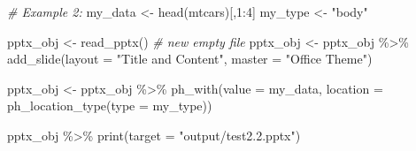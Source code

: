 \documentclass[
]{book}
\newenvironment{Shaded}{\begin{snugshade}}{\end{snugshade}}
\newcommand{\AttributeTok}[1]{\textcolor[rgb]{0.77,0.63,0.00}{#1}}
\newcommand{\CommentTok}[1]{\textcolor[rgb]{0.56,0.35,0.01}{\textit{#1}}}
\newcommand{\DecValTok}[1]{\textcolor[rgb]{0.00,0.00,0.81}{#1}}
\newcommand{\FunctionTok}[1]{\textcolor[rgb]{0.00,0.00,0.00}{#1}}
\newcommand{\NormalTok}[1]{#1}
\newcommand{\OtherTok}[1]{\textcolor[rgb]{0.56,0.35,0.01}{#1}}
\newcommand{\SpecialCharTok}[1]{\textcolor[rgb]{0.00,0.00,0.00}{#1}}
\newcommand{\StringTok}[1]{\textcolor[rgb]{0.31,0.60,0.02}{#1}}
\begin{document}
\begin{Shaded}
\begin{Highlighting}[]
\CommentTok{\# Example 2: }
\NormalTok{my\_data }\OtherTok{\textless{}{-}} \FunctionTok{head}\NormalTok{(mtcars)[,}\DecValTok{1}\SpecialCharTok{:}\DecValTok{4}\NormalTok{]}
\NormalTok{my\_type }\OtherTok{\textless{}{-}} \StringTok{"body"}

\NormalTok{pptx\_obj }\OtherTok{\textless{}{-}} \FunctionTok{read\_pptx}\NormalTok{() }\CommentTok{\# new empty file}
\NormalTok{pptx\_obj }\OtherTok{\textless{}{-}}\NormalTok{ pptx\_obj }\SpecialCharTok{\%\textgreater{}\%} 
    \FunctionTok{add\_slide}\NormalTok{(}\AttributeTok{layout =} \StringTok{"Title and Content"}\NormalTok{, }\AttributeTok{master =} \StringTok{"Office Theme"}\NormalTok{)}

\NormalTok{pptx\_obj }\OtherTok{\textless{}{-}}\NormalTok{ pptx\_obj }\SpecialCharTok{\%\textgreater{}\%} 
  \FunctionTok{ph\_with}\NormalTok{(}\AttributeTok{value =}\NormalTok{ my\_data, }\AttributeTok{location =} \FunctionTok{ph\_location\_type}\NormalTok{(}\AttributeTok{type =}\NormalTok{ my\_type)) }

\NormalTok{pptx\_obj }\SpecialCharTok{\%\textgreater{}\%}
  \FunctionTok{print}\NormalTok{(}\AttributeTok{target =} \StringTok{"output/test2.2.pptx"}\NormalTok{) }
\end{Highlighting}
\end{Shaded}
\end{document}
